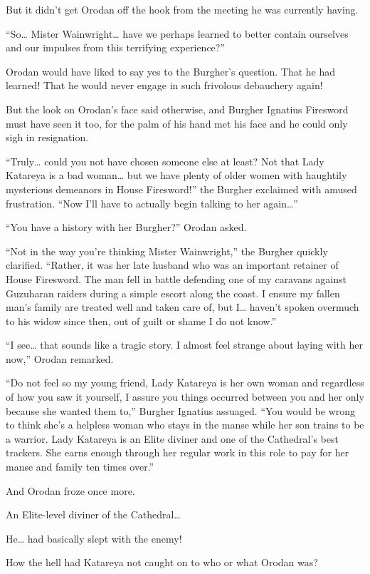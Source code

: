 \documentclass[a4paper,10pt]{book}
\begin{document}
But it didn’t get Orodan off the hook from the meeting he was currently having.\par
“So… Mister Wainwright… have we perhaps learned to better contain ourselves and our impulses from this terrifying experience?”\par
Orodan would have liked to say yes to the Burgher’s question. That he had learned! That he would never engage in such frivolous debauchery again!\par
But the look on Orodan’s face said otherwise, and Burgher Ignatius Firesword must have seen it too, for the palm of his hand met his face and he could only sigh in resignation.\par
“Truly… could you not have chosen someone else at least? Not that Lady Katareya is a bad woman… but we have plenty of older women with haughtily mysterious demeanors in House Firesword!” the Burgher exclaimed with amused frustration. “Now I’ll have to actually begin talking to her again…”\par
“You have a history with her Burgher?” Orodan asked.\par
“Not in the way you’re thinking Mister Wainwright,” the Burgher quickly clarified. “Rather, it was her late husband who was an important retainer of House Firesword. The man fell in battle defending one of my caravans against Guzuharan raiders during a simple escort along the coast. I ensure my fallen man’s family are treated well and taken care of, but I… haven’t spoken overmuch to his widow since then, out of guilt or shame I do not know.”\par
“I see… that sounds like a tragic story. I almost feel strange about laying with her now,” Orodan remarked.\par
“Do not feel so my young friend, Lady Katareya is her own woman and regardless of how you saw it yourself, I assure you things occurred between you and her only because she wanted them to,” Burgher Ignatius assuaged. “You would be wrong to think she’s a helpless woman who stays in the manse while her son trains to be a warrior. Lady Katareya is an Elite diviner and one of the Cathedral’s best trackers. She earns enough through her regular work in this role to pay for her manse and family ten times over.”\par
And Orodan froze once more.\par
An Elite-level diviner of the Cathedral…\par
He… had basically slept with the enemy!\par
How the hell had Katareya not caught on to who or what Orodan was?\par
\end{document}
